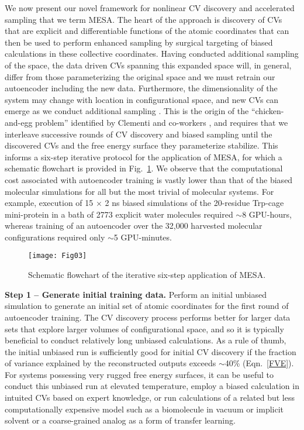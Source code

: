 \documentclass[12pt]{article}
\newcommand*{\blauw}[1]{#1}
\newcommand*{\blauwr}[1]{#1}
\begin{document}
\blauwr{We now present our novel framework for nonlinear CV discovery and accelerated sampling that we term MESA.} The heart of the approach is discovery of CVs that are explicit and differentiable functions of the atomic coordinates that can then be used to perform enhanced sampling by surgical targeting of biased calculations in these collective coordinates. Having conducted additional sampling of the space, the data driven CVs spanning this expanded space will, in general, differ from those parameterizing the original space and we must retrain our autoencoder including the new data. Furthermore, the dimensionality of the system may change with location in configurational space, and new CVs can emerge as we conduct additional sampling \cite{ferguson2011integrating,chiavazzo2017intrinsic}. This is the origin of the ``chicken-and-egg problem'' identified by Clementi and co-workers \cite{rohrdanz2013discovering}, and requires that we interleave successive rounds of CV discovery and biased sampling until the discovered CVs and the free energy surface they parameterize stabilize. This informs a six-step iterative protocol for the application of MESA, for which a schematic flowchart is provided in \blauw{Fig.~\ref{flowchart}}. \blauwr{We observe that the computational cost associated with autoencoder training is vastly lower than that of the biased molecular simulations for all but the most trivial of molecular systems. For example, execution of 15 $\times$ 2 ns biased simulations of the 20-residue Trp-cage mini-protein \cite{neidigh2002designing} in a bath of 2773 explicit water molecules required $\sim$8 GPU-hours, whereas training of an autoencoder over the 32,000 harvested molecular configurations required only $\sim$5 GPU-minutes.}

\begin{figure}[ht!]
\begin{center}
\texttt{[image: Fig03]} 
\caption{Schematic flowchart of the iterative six-step application of MESA.} \label{flowchart}
\end{center}
\end{figure}

\vspace{0.25in}

\textbf{Step 1 -- Generate initial training data.} Perform an initial unbiased simulation to generate an initial set of atomic coordinates for the first round of autoencoder training. The CV discovery process performs better for larger data sets that explore larger volumes of configurational space, and so it is typically beneficial to conduct relatively long unbiased calculations. As a rule of thumb, the initial unbiased run is sufficiently good for initial CV discovery if the fraction of variance explained by the reconstructed outputs exceeds $\sim$40\% (\blauw{Eqn.~\ref{FVE}}). For systems possessing very rugged free energy surfaces, it can be useful to conduct this unbiased run at elevated temperature, employ a biased calculation in intuited CVs based on expert knowledge, or run calculations of a related but less computationally expensive model such as a biomolecule in vacuum or implicit solvent or a coarse-grained analog as a form of transfer learning\cite{hashemian2013modeling, sultan2017transfer}.
\end{document}
